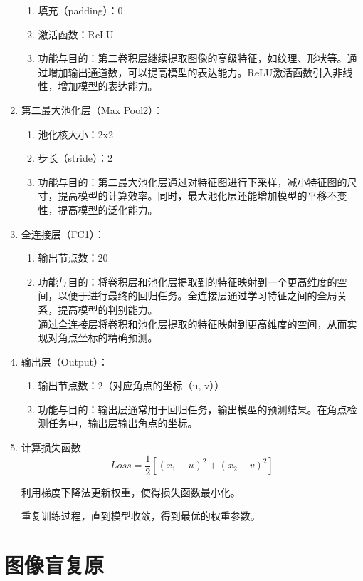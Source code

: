 \documentclass{lzureport}
\begin{document}
\begin{enumerate}[label=\arabic*)]
\begin{enumerate}[itemindent=1em,label=(\arabic*)]
		\item 填充（padding）：0
		\item 激活函数：ReLU
		\item 功能与目的：第二卷积层继续提取图像的高级特征，如纹理、形状等。通过增加输出通道数，可以提高模型的表达能力。ReLU激活函数引入非线性，增加模型的表达能力。
	\end{enumerate}
	\item 第二最大池化层（Max Pool2）：
	\begin{enumerate}[itemindent=1em,label=(\arabic*)]
		\item 池化核大小：2x2
		\item 步长（stride）：2
		\item 功能与目的：第二最大池化层通过对特征图进行下采样，减小特征图的尺寸，提高模型的计算效率。同时，最大池化层还能增加模型的平移不变性，提高模型的泛化能力。
	\end{enumerate}
	\item 全连接层（FC1）：
	\begin{enumerate}[itemindent=1em,label=(\arabic*)]
		\item 输出节点数：20
		\item 功能与目的：将卷积层和池化层提取到的特征映射到一个更高维度的空间，以便于进行最终的回归任务。全连接层通过学习特征之间的全局关系，提高模型的判别能力。	\\
		通过全连接层将卷积和池化层提取的特征映射到更高维度的空间，从而实现对角点坐标的精确预测。
	\end{enumerate}
	\item 输出层（Output）：
	\begin{enumerate}[itemindent=1em,label=(\arabic*)]
		\item 输出节点数：2（对应角点的坐标（u, v））
		\item 功能与目的：输出层通常用于回归任务，输出模型的预测结果。在角点检测任务中，输出层输出角点的坐标。
	\end{enumerate}		
	
	\item 计算损失函数
	$$Loss = \frac{1}{2}[(x_1 - u)^2 + (x_2 - v)^2]$$

	利用梯度下降法更新权重，使得损失函数最小化。

	重复训练过程，直到模型收敛，得到最优的权重参数。

	
\end{enumerate}

\newpage
\section{图像盲复原}
\end{document}
